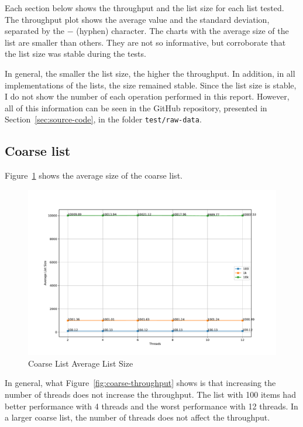 \documentclass{article}
\begin{document}
Each section below shows the throughput and the list size for each list tested. The throughput plot shows the average value and the standard deviation, separated by the $-$ (hyphen) character. The charts with the average size of the list are smaller than others. They are not so informative, but corroborate that the list size was stable during the tests.

In general, the smaller the list size, the higher the throughput. In addition, in all implementations of the lists, the size remained stable. Since the list size is stable, I do not show the number of each operation performed in this report. However, all of this information can be seen in the GitHub repository, presented in Section~\ref{sec:source-code}, in the folder \texttt{test/raw-data}.

\subsection{Coarse list}

Figure~\ref{fig:coarse-size} shows the average size of the coarse list.

\begin{figure}[H]
    \centering
    \includegraphics[scale=0.3]{../test/plots/CoarseListAverageListSize.pdf}
    \caption{Coarse List Average List Size}
    \label{fig:coarse-size}
\end{figure}

In general, what Figure~\ref{fig:coarse-throughput} shows is that increasing the number of threads does not increase the throughput. The list with 100 items had better performance with 4 threads and the worst performance with 12 threads. In a larger coarse list, the number of threads does not affect the throughput.
\end{document}
